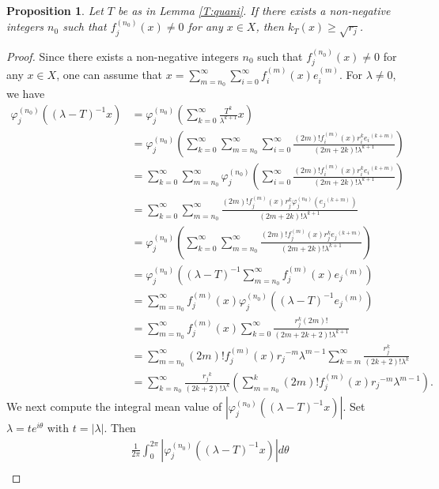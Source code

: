 \documentclass[12pt]{amsart}
\numberwithin{equation}{section}
\theoremstyle{plain}
\newtheorem{prop}[thm]{Proposition}
\theoremstyle{definition}
\begin{document}
\begin{prop}\label{T:subsetr}
Let $T$ be as in Lemma \ref{T:quani}.
If there exists a non-negative integers $n_0$ such that $f_{j}^{(n_0)}(x)\neq 0$ for any $x\in X$,
then $k_{T}(x)\geq \sqrt{r_j}$.
\end{prop}

\begin{proof}
Since there exists a non-negative integers $n_0$ such that
$f_{j}^{(n_0)}(x)\neq 0$ for any $x\in X$,
one can assume that
$x=\sum_{m=n_0}^{\infty}\sum_{i=0}^{\infty}f_{i}^{(m)}(x)e_i^{(m)}$.
For $\lambda\neq 0$, we have
\begin{align*}
\varphi_{j}^{(n_0)}\left((\lambda-T)^{-1}x\right)
&=\varphi_{j}^{(n_0)}\left(\sum_{k=0}^{\infty}\frac{T^k}{\lambda^{k+1}}x\right)\\
&=\varphi_{j}^{(n_0)}\left(\sum_{k=0}^{\infty}\sum_{m=n_0}^{\infty}\sum_{i=0}^{\infty}\frac{(2m)!f_i^{(m)}(x)r_i^k{e_i}^{(k+m)}}{(2m+2k)!\lambda^{k+1}}\right)\\
&=\sum_{k=0}^{\infty}\sum_{m=n_0}^{\infty}\varphi_{j}^{(n_0)}\left(\sum_{i=0}^{\infty}\frac{(2m)!f_i^{(m)}(x)r_i^k{e_i}^{(k+m)}}{(2m+2k)!\lambda^{k+1}}\right)\\
&=\sum_{k=0}^{\infty}\sum_{m=n_0}^{\infty}\frac{(2m)!f_j^{(m)}(x)r_j^k\varphi_{j}^{(n_0)}\left({e_j}^{(k+m)}\right)}{(2m+2k)!\lambda^{k+1}}\\
&=\varphi_{j}^{(n_0)}\left(\sum_{k=0}^{\infty}\sum_{m=n_0}^{\infty}\frac{(2m)!f_j^{(m)}(x)r_j^k{e_j}^{(k+m)}}{(2m+2k)!\lambda^{k+1}}\right)\\
&=\varphi_{j}^{(n_0)}\left((\lambda-T)^{-1}\sum_{m=n_0}^{\infty}f_j^{(m)}(x){e_j}^{(m)}\right)\\
&=\sum_{m=n_0}^{\infty}f_j^{(m)}(x)\varphi_{j}^{(n_0)}\left((\lambda-T)^{-1}{e_j}^{(m)}\right)\\
&=\sum_{m=n_0}^{\infty}f_j^{(m)}(x)
\sum_{k=0}^{\infty}\frac{r_j^k (2m)!}{(2m+2k+2)!\lambda^{k+1}}\\
&=\sum_{m=n_0}^{\infty}(2m)!f_j^{(m)}(x){r_j}^{-m}\lambda^{m-1}\sum_{k=m}^{\infty}\frac{r_j^k}{(2k+2)!\lambda^{k}}\\
&=\sum_{k=n_0}^{\infty}\frac{{r_j}^k}{(2k+2)!\lambda^{k}}\left(\sum_{m=n_0}^{k}(2m)!f_j^{(m)}(x){r_j}^{-m}\lambda^{m-1}\right).
\end{align*}
We next compute the integral mean value of $\left|\varphi_{j}^{(n_0)}\left((\lambda-T)^{-1}x\right)\right|$.
Set $\lambda=te^{i\theta}$ with $t=|\lambda|$.
Then
\begin{align*}
&\frac{1}{2\pi}\int_{0}^{2\pi}\left|\varphi_{j}^{(n_0)}\left((\lambda-T)^{-1}x\right)\right| d\theta\\

\end{align*}
\end{proof}
\end{document}
